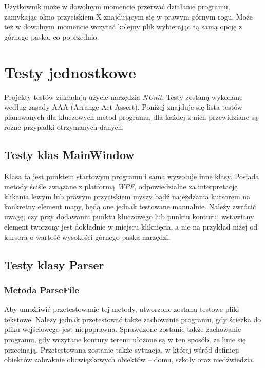 \documentclass[a4paper,11pt]{article}
\newcommand\tab[1][0.6cm]{\hspace*{#1}}
\begin{document}
Użytkownik może w dowolnym momencie przerwać działanie programu, zamykając okno przyciskiem X znajdującym się w prawym górnym rogu. Może też w dowolnym momencie wczytać kolejny plik wybierając tą samą opcję z górnego paska, co poprzednio.

\section{Testy jednostkowe}

\tab Projekty testów zakładają użycie narzędzia \textit{NUnit}. Testy zostaną wykonane według zasady AAA (Arrange Act Assert). Poniżej znajduje się lista testów planowanych dla kluczowych metod programu, dla każdej z nich przewidziane są różne przypadki otrzymanych danych. 

\subsection{Testy klas MainWindow}

\tab Klasa ta jest punktem startowym programu i sama wywołuje inne klasy. Posiada metody ściśle związane z platformą \textit{WPF}, odpowiedzialne za interpretację klikania lewym lub prawym przyciskiem myszy bądź najeżdżania kursorem na konkretny element mapy, będą one jednak testowane manualnie. Należy zwrócić uwagę, czy przy dodawaniu punktu kluczowego lub punktu konturu, wstawiany element tworzony jest dokładnie w miejscu kliknięcia, a nie na przykład niżej od kursora o wartość wysokości górnego paska narzędzi.

\subsection{Testy klasy Parser}

\subsubsection{Metoda ParseFile}
\tab Aby umożliwić przetestowanie tej metody, utworzone zostaną testowe pliki tekstowe. Należy jednak przetestować także zachowanie programu, gdy ścieżka do pliku wejściowego jest niepoprawna. Sprawdzone zostanie także zachowanie programu, gdy wczytane kontury terenu ułożone są w ten sposób, że linie się przecinają. Przetestowana zostanie także sytuacja, w której wśród definicji obiektów zabraknie obowiązkowych obiektów -- domu, szkoły oraz niedźwiedzia.
\end{document}
